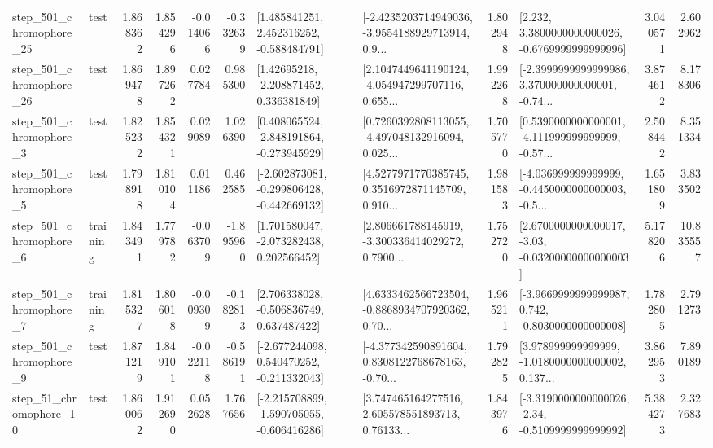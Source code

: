 \begin{tabular}{llrrrrllrlrr}
  step\_501\_chromophore\_25 &      test &      1.868362 &    1.854296 &     -0.014066 & -0.332639 &    [1.485841251, 2.452316252, -0.588484791] &  [-2.4235203714949036, -3.9554188929713914, 0.9... &       1.802948 &   [2.232, 3.3800000000000026, -0.6769999999999996] &            3.040571 &          2.602962 \\
  step\_501\_chromophore\_26 &      test &      1.869478 &    1.897262 &      0.027784 &  0.985300 &     [1.42695218, -2.208871452, 0.336381849] &  [2.1047449641190124, -4.054947299707116, 0.655... &       1.992268 &  [-2.3999999999999986, 3.370000000000001, -0.74... &            3.874612 &          8.178306 \\
   step\_501\_chromophore\_3 &      test &      1.825232 &    1.854321 &      0.029089 &  1.026390 &   [0.408065524, -2.848191864, -0.273945929] &  [0.7260392808113055, -4.497048132916094, 0.025... &       1.705770 &  [0.5390000000000001, -4.111999999999999, -0.57... &            2.508442 &          8.351334 \\
   step\_501\_chromophore\_5 &      test &      1.798918 &    1.810104 &      0.011186 &  0.462585 &  [-2.602873081, -0.299806428, -0.442669132] &  [4.5277971770385745, 0.3516972871145709, 0.910... &       1.981583 &  [-4.036999999999999, -0.4450000000000003, -0.5... &            1.651809 &          3.833502 \\
   step\_501\_chromophore\_6 &  training &      1.843491 &    1.779782 &     -0.063709 & -1.895960 &    [1.701580047, -2.073282438, 0.202566452] &  [2.806661788145919, -3.300336414029272, 0.7900... &       1.752720 &  [2.6700000000000017, -3.03, -0.03200000000000003] &            5.178206 &         10.835557 \\
   step\_501\_chromophore\_7 &  training &      1.815327 &    1.806018 &     -0.009309 & -0.182813 &    [2.706338028, -0.506836749, 0.637487422] &  [4.6333462566723504, -0.8868934707920362, 0.70... &       1.965211 &  [-3.9669999999999987, 0.742, -0.8030000000000008] &            1.782805 &          2.791273 \\
   step\_501\_chromophore\_9 &      test &      1.871219 &    1.849101 &     -0.022118 & -0.586191 &   [-2.677244098, 0.540470252, -0.211332043] &  [-4.377342590891604, 0.8308122768678163, -0.70... &       1.792825 &  [3.978999999999999, -1.0180000000000002, 0.137... &            3.862953 &          7.890189 \\
   step\_51\_chromophore\_10 &      test &      1.860062 &    1.912690 &      0.052628 &  1.767656 &  [-2.215708899, -1.590705055, -0.606416286] &  [3.747465164277516, 2.605578551893713, 0.76133... &       1.843976 &  [-3.3190000000000026, -2.34, -0.5109999999999992] &            5.384273 &          2.327683 \\

\end{tabular}
